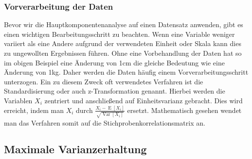 \subsubsection{Vorverarbeitung der Daten}

Bevor wir die Hauptkomponentenanalyse auf einen Datensatz anwenden, gibt es einen wichtigen Bearbeitungsschritt zu beachten. Wenn eine Variable weniger variiert als eine Andere aufgrund der verwendeten Einheit oder Skala kann dies zu ungewollten Ergebnissen führen. Ohne eine Vorbehandlung der Daten hat so im obigen Beispiel eine Änderung von 1cm die gleiche Bedeutung wie eine Änderung von 1kg.  Daher werden die Daten häufig einem Vorverarbeitungsschritt unterzogen. Ein zu diesem Zweck oft verwendetes Verfahren ist die Standardisierung oder auch z-Transformation genannt. Hierbei werden die Variablen $X_i$ zentriert und anschließend auf Einheitsvarianz gebracht. Dies wird erreicht, indem man $X_i$ durch $\frac{X_i - \operatorname{E}[X_i]}{\sqrt{\operatorname{Var}[X_i]}}$ ersetzt. Mathematisch gesehen wendet man das Verfahren somit auf die Stichprobenkorrelationsmatrix an.

\subsection{Maximale Varianzerhaltung}

